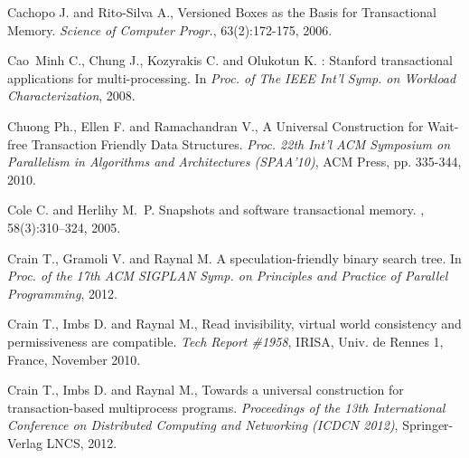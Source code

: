 \begin{thebibliography}{99}
{
Cachopo J. and Rito-Silva A., 
Versioned Boxes as the Basis for Transactional Memory. 
{\it Science of Computer Progr.}, 63(2):172-175, 2006. 





Cao~Minh C., Chung J., Kozyrakis C. and Olukotun K.
: Stanford transactional applications for multi-processing.
\newblock In {\em Proc. of The IEEE Int'l Symp. on Workload Characterization},
  2008.



Chuong Ph., Ellen F. and Ramachandran V.,
A Universal Construction for Wait-free Transaction Friendly Data Structures.
{\it Proc. 22th  Int'l  ACM Symposium on Parallelism in Algorithms 
and Architectures   (SPAA'10)},  ACM Press, pp. 335-344,  2010. 

Cole C. and Herlihy M.~P.
\newblock Snapshots and software transactional memory.
, 58(3):310--324, 2005.



Crain T., Gramoli V. and Raynal M.
\newblock A speculation-friendly binary search tree.
\newblock In {\em Proc. of the 17th ACM SIGPLAN Symp. on Principles and
  Practice of Parallel Programming}, 2012.




Crain T., Imbs D. and Raynal M.,
Read invisibility, virtual world consistency and  permissiveness
are compatible.
{\it Tech Report \#1958}, IRISA, Univ. de  Rennes 1, France, November 2010. 



Crain T., Imbs D. and Raynal M.,
Towards a universal construction for transaction-based multiprocess programs.
{\it Proceedings of the 13th International Conference on Distributed Computing and Networking (ICDCN 2012)}, 
Springer-Verlag LNCS, 2012.




}
\end{thebibliography}

